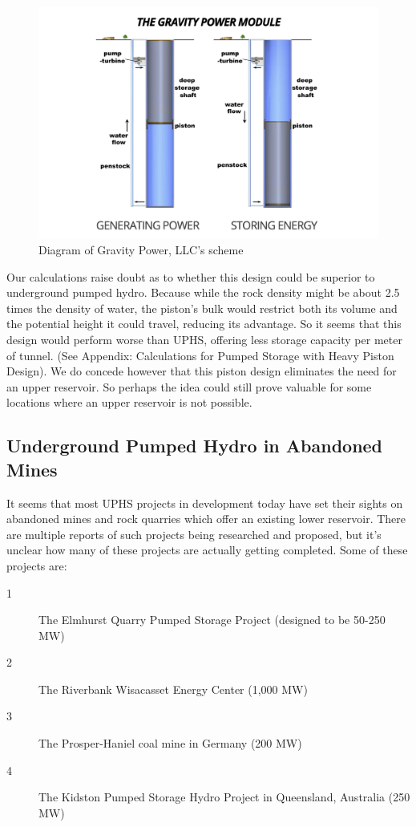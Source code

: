 \documentclass[hidelinks,12pt,a4paper]{article}
\begin{document}
\begin{figure}[ht!]
    \centering
    \includegraphics[width=1\textwidth]{gravity-power-diagram.png}
    \caption{Diagram of Gravity Power, LLC's scheme \cite{GravityPowerTechnologyPage}}
\end{figure}
\FloatBarrier

Our calculations raise doubt as to whether this design could be superior to underground pumped hydro. Because while the rock density might be about 2.5 times the density of water, the piston's bulk would restrict both its volume and the potential height it could travel, reducing its advantage. So it seems that this design would perform worse than UPHS, offering less storage capacity per meter of tunnel. (See Appendix: Calculations for Pumped Storage with Heavy Piston Design). We do concede however that this piston design eliminates the need for an upper reservoir. So perhaps the idea could still prove valuable for some locations where an upper reservoir is not possible.

\subsection{Underground Pumped Hydro in Abandoned Mines}
It seems that most UPHS projects in development today have set their sights on abandoned mines and rock quarries which offer an existing lower reservoir. There are multiple reports of such projects being researched and proposed, but it's unclear how many of these projects are actually getting completed. Some of these projects are:\cite{SubSurfacePumpedHydroelectricStorage, GermanCoalMineMayBePrimeForPumpedStorage, 250MWKidstonPumpedStorageHydroProject}
{\footnotesize
\begin{description}
    \item[1] The Elmhurst Quarry Pumped Storage Project (designed to be 50-250 MW)
    \item[2] The Riverbank Wisacasset Energy Center (1,000 MW)
    \item[3] The Prosper-Haniel coal mine in Germany (200 MW)
    \item[4] The Kidston Pumped Storage Hydro Project in Queensland, Australia (250 MW)
\end{description}
}
\end{document}
